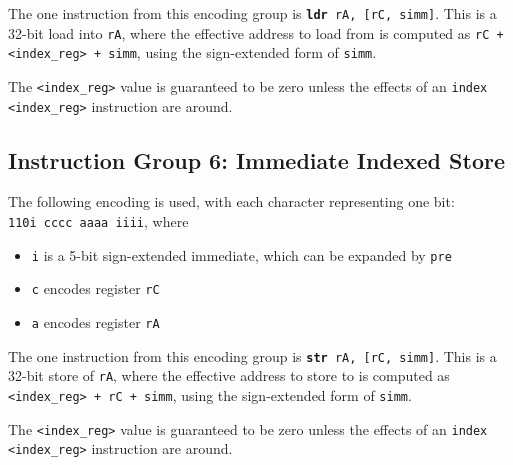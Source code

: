 \documentclass{article}
\begin{document}
	The one instruction from this encoding group is
	\texttt{\textbf{ldr} rA, [rC, simm]}.
	This is a 32-bit load into \texttt{rA}, where the effective address to
	load from is computed as \texttt{rC + <index\_reg> + simm}, using the
	sign-extended form of \texttt{simm}.

	The \texttt{<index\_reg>} value is guaranteed to be zero unless the
	effects of an \texttt{index <index\_reg>} instruction are around.


	\subsection{Instruction Group 6:  Immediate Indexed Store}
	The following encoding is used, with each character representing one
	bit:  \\
	\texttt{110i cccc aaaa iiii}, where

	\singlespacing
	\begin{itemize}
		\item \texttt{i} is a 5-bit sign-extended immediate, which can
		be expanded by \texttt{pre}  
		\item \texttt{c} encodes register \texttt{rC}
		\item \texttt{a} encodes register \texttt{rA}
	\end{itemize}
	\doublespacing

	The one instruction from this encoding group is
	\texttt{\textbf{str} rA, [rC, simm]}.
	This is a 32-bit store of \texttt{rA}, where the effective address to
	store to is computed as \texttt{<index\_reg> + rC + simm}, using the
	sign-extended form of \texttt{simm}.

	The \texttt{<index\_reg>} value is guaranteed to be zero unless the
	effects of an \texttt{index <index\_reg>} instruction are around.


\end{document}

